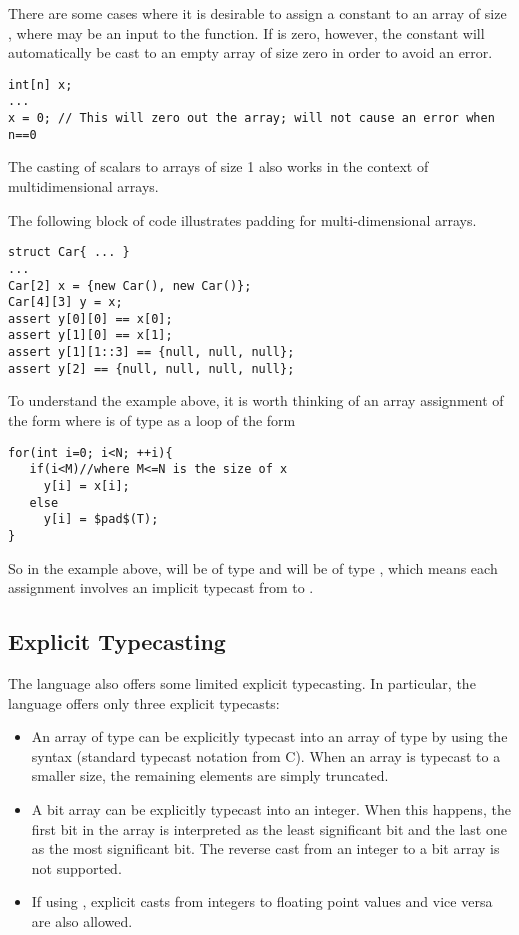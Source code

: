 There are some cases where it is desirable to assign a constant to an array of size , where  may be an input to the function. If  is zero, however, the constant will automatically be cast to an empty array of size zero in order to avoid an error.

\begin{Example}
\begin{lstlisting}
int[n] x;
...
x = 0; // This will zero out the array; will not cause an error when n==0
\end{lstlisting}
\end{Example}


The casting of scalars to arrays of size 1 also works in the context of multidimensional arrays.
\begin{Example}
The following block of code illustrates padding for multi-dimensional arrays.
\begin{lstlisting}
struct Car{ ... }
...
Car[2] x = {new Car(), new Car()};
Car[4][3] y = x;
assert y[0][0] == x[0];
assert y[1][0] == x[1];
assert y[1][1::3] == {null, null, null};
assert y[2] == {null, null, null, null};
\end{lstlisting}
\end{Example}

To understand the example above, it is worth thinking of an array assignment of the form  where  is of type  as a loop of the form 
\begin{lstlisting}
for(int i=0; i<N; ++i){
   if(i<M)//where M<=N is the size of x
     y[i] = x[i];
   else
     y[i] = $pad$(T);
}
\end{lstlisting}
So in the example above,  will be of type  and  will be of type , which means each assignment involves an implicit typecast from  to .


\subsection{Explicit Typecasting}
The \Sk{} language also offers some limited explicit typecasting. In particular, the language offers only three explicit typecasts:
\begin{itemize}

\item An array  of type  can be explicitly typecast into an array of type  by using the syntax  (standard typecast notation from C). When an array is typecast to a smaller size, the remaining elements are simply truncated. 

\item A bit array  can be explicitly typecast into an integer. When this happens, the first bit in the array is interpreted as the least significant bit and the last one as the most significant bit. The reverse cast from an integer to a bit array is not supported.

\item If using , explicit casts from integers to floating point values and vice versa are also allowed.

\end{itemize}

